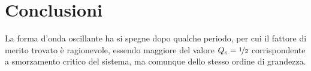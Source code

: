 \documentclass[a4paper, 12pt, italian]{article}
\begin{document}
\section{Conclusioni}
La forma d'onda oscillante ha si spegne dopo qualche periodo, per cui
il fattore di merito trovato è ragionevole, essendo maggiore del valore
$Q_c = \nicefrac{1}{2}$ corrispondente a smorzamento critico del sistema,
ma comunque dello stesso ordine di grandezza.

\end{document}
